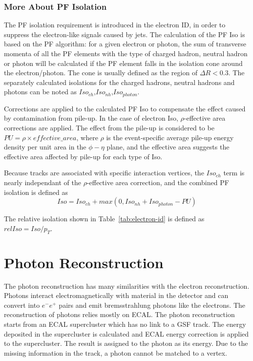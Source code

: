 \subsubsection{More About PF Isolation}
The PF isolation requirement is introduced in the electron ID, in order to suppress the electron-like signals caused by jets. The calculation of the PF Iso is based on the PF algorithm: for a given electron or photon, the sum of transverse momenta of all the PF elements with the type of charged hadron, neutral hadron or photon will be calculated if the PF element falls in the isolation cone around the electron/photon. The cone is usually defined as the region of $\Delta R<0.3$. The separately calculated isolations for the charged hadrons, neutral hadrons and photons can be noted as $Iso_{ch}$,$Iso_{nh}$,$Iso_{photon}$.

\vspace{0.3cm}
Corrections are applied to the calculated PF Iso to compensate the effect caused by contamination from pile-up. In the case of electron Iso, $\rho$-effective area corrections are applied. The effect from the pile-up is considered to be $PU= \rho \times effective\_{area}$, where $\rho$ is the event-specific average pile-up energy density per unit area in the $\phi-\eta$ plane, and the effective area suggests the effective area affected by pile-up for each type of Iso. 

\vspace{0.3cm}
Because tracks are associated with specific interaction vertices, the $Iso_{ch}$ term is nearly independant of the $\rho$-effective area correction, and the combined PF isolation is defined as
\begin{equation}
Iso=Iso_{ch}+max(0,Iso_{nh}+Iso_{photon}-PU)
\label{eqn:ob_egmiso}
\end{equation}

The relative isolation shown in Table~\ref{tab:electron-id} is defined as $relIso=Iso/p_{T}$.

\section{Photon Reconstruction}
The photon reconstruction has many similarities with the electron reconstruction. Photons interact electromagnetically with material in the detector and can convert into $e^{-}e^{+}$ pairs and emit bremsstrahlung photons like the electrons. The reconstruction of photons relies mostly on ECAL. The photon reconstruction starts from an ECAL supercluster which has no link to a GSF track. The energy deposited in the supercluster is calculated and ECAL energy correction is applied to the supercluster. The result is assigned to the photon as its energy. Due to the missing information in the track, a photon cannot be matched to a vertex.


